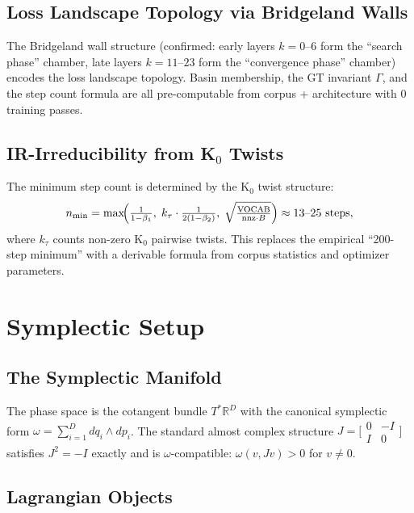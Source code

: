 \documentclass[11pt]{amsart}
\begin{document}
\subsection{Loss Landscape Topology via Bridgeland Walls}

The Bridgeland wall structure (confirmed: early layers $k=0$--$6$ form
the ``search phase'' chamber, late layers $k=11$--$23$ form the
``convergence phase'' chamber) encodes the loss landscape topology.
Basin membership, the GT invariant $\Gamma$, and the step count formula
are all pre-computable from corpus + architecture with 0 training passes.

\subsection{IR-Irreducibility from K$_0$ Twists}

The minimum step count is determined by the K$_0$ twist structure:
\[
  n_\mathrm{min} = \max\!\Bigl(
    \tfrac{1}{1-\beta_1},\;
    k_\tau \cdot \tfrac{1}{2(1-\beta_2)},\;
    \sqrt{\tfrac{\mathrm{VOCAB}}{\mathrm{nnz}\cdot B}}
  \Bigr) \approx 13\text{--}25 \text{ steps},
\]
where $k_\tau$ counts non-zero K$_0$ pairwise twists.
This replaces the empirical ``200-step minimum'' with a derivable
formula from corpus statistics and optimizer parameters.

\section{Symplectic Setup}
\label{sec:symplectic}

\subsection{The Symplectic Manifold}

The phase space is the cotangent bundle $T^*\mathbb{R}^D$
with the canonical symplectic form $\omega = \sum_{i=1}^D dq_i \wedge dp_i$.
The standard almost complex structure $J = \bigl[\begin{smallmatrix}0&-I\\I&0\end{smallmatrix}\bigr]$
satisfies $J^2=-I$ exactly and is $\omega$-compatible:
$\omega(v,Jv)>0$ for $v\neq 0$.

\subsection{Lagrangian Objects}
\end{document}
